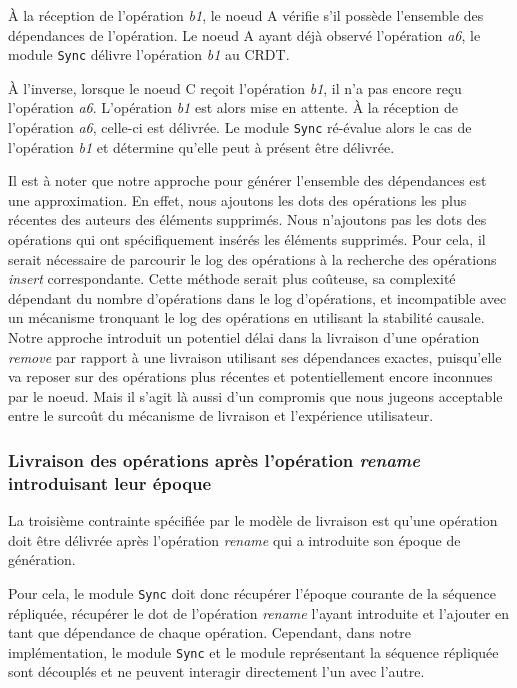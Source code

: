 \documentclass[12pt]{thesul}
\begin{document}
À la réception de l'opération \emph{b1}, le noeud A vérifie s'il possède l'ensemble des dépendances de l'opération.
Le noeud A ayant déjà observé l'opération \emph{a6}, le module \texttt{Sync} délivre l'opération \emph{b1} au \ac{CRDT}.

À l'inverse, lorsque le noeud C reçoit l'opération \emph{b1}, il n'a pas encore reçu l'opération \emph{a6}.
L'opération \emph{b1} est alors mise en attente.
À la réception de l'opération \emph{a6}, celle-ci est délivrée.
Le module \texttt{Sync} ré-évalue alors le cas de l'opération \emph{b1} et détermine qu'elle peut à présent être délivrée.

Il est à noter que notre approche pour générer l'ensemble des dépendances est une approximation.
En effet, nous ajoutons les dots des opérations les plus récentes des auteurs des éléments supprimés.
Nous n'ajoutons pas les dots des opérations qui ont spécifiquement insérés les éléments supprimés.
Pour cela, il serait nécessaire de parcourir le log des opérations à la recherche des opérations \emph{insert} correspondante.
Cette méthode serait plus coûteuse, sa complexité dépendant du nombre d'opérations dans le log d'opérations, et incompatible avec un mécanisme tronquant le log des opérations en utilisant la stabilité causale.
Notre approche introduit un potentiel délai dans la livraison d'une opération \emph{remove} par rapport à une livraison utilisant ses dépendances exactes, puisqu'elle va reposer sur des opérations plus récentes et potentiellement encore inconnues par le noeud.
Mais il s'agit là aussi d'un compromis que nous jugeons acceptable entre le surcoût du mécanisme de livraison et l'expérience utilisateur.

\subsubsection{Livraison des opérations après l'opération \emph{rename} introduisant leur époque}

La troisième contrainte spécifiée par le modèle de livraison est qu'une opération doit être délivrée après l'opération \emph{rename} qui a introduite son époque de génération.

Pour cela, le module \texttt{Sync} doit donc récupérer l'époque courante de la séquence répliquée, récupérer le dot de l'opération \emph{rename} l'ayant introduite et l'ajouter en tant que dépendance de chaque opération.
Cependant, dans notre implémentation, le module \texttt{Sync} et le module représentant la séquence répliquée sont découplés et ne peuvent interagir directement l'un avec l'autre.
\end{document}
